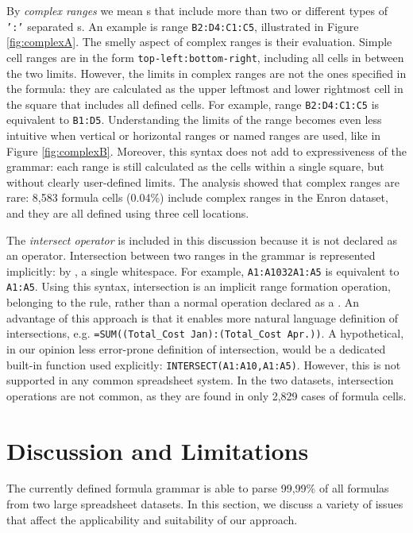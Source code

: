 \documentclass[conference]{IEEEtran}
\begin{document}
By \textit{complex ranges} we mean s that include more than two or different types of \texttt{':'} separated s. An example is range \texttt{B2:D4:C1:C5}, illustrated in Figure \ref{fig:complexA}. The smelly aspect of complex ranges is their evaluation. Simple cell ranges are in the form \texttt{top-left:bottom-right}, including all cells in between the two limits. However, the limits in complex ranges are not the ones specified in the formula: they are calculated as the upper leftmost and lower rightmost cell in the square that includes all defined cells. For example, range \texttt{B2:D4:C1:C5} is equivalent to \texttt{B1:D5}. Understanding the limits of the range becomes even less intuitive when vertical or horizontal ranges or named ranges are used, like in Figure \ref{fig:complexB}. Moreover, this syntax does not add to expressiveness of the grammar: each range is still calculated as the cells within a single square, but without clearly user-defined limits. The analysis showed that complex ranges are rare: 8,583 formula cells	(0.04\%) include complex ranges in the Enron dataset, and they are all defined using three cell locations. 

The \textit{intersect operator} is included in this discussion because it is not declared as an operator. Intersection between two ranges in the grammar is represented implicitly: by \texttt{}, a single whitespace. For example, \texttt{A1:A10\char32A1:A5} is equivalent to \texttt{A1:A5}. Using this syntax, intersection is an implicit range formation operation, belonging to the  rule, rather than a normal operation declared as a . An advantage of this approach is that it enables more natural language definition of intersections, e.g. \texttt{=SUM((Total_Cost Jan):(Total_Cost Apr.))}. A hypothetical, in our opinion less error-prone definition of intersection, would be a dedicated built-in function used explicitly: \texttt{INTERSECT(A1:A10,A1:A5)}. However, this is not supported in any common spreadsheet system. In the two datasets, intersection operations are not common, as they are found in only 2,829 cases of formula cells.

\section{Discussion and Limitations}
\label{sec:discussion}
The currently defined formula grammar is able to parse 99,99\% of all formulas from two large spreadsheet datasets. In this section, we discuss a variety of issues that affect the applicability and suitability of our approach.
\end{document}
